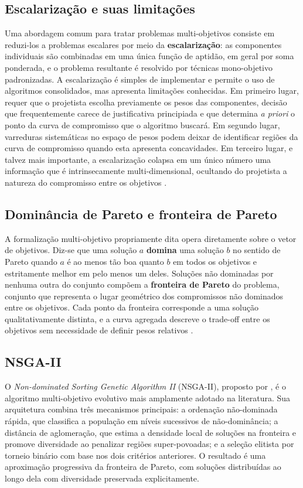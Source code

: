 \subsection{Escalarização e suas limitações}

Uma abordagem comum para tratar problemas multi-objetivos consiste em reduzi-los a problemas escalares por meio da \textbf{escalarização}: as componentes individuais são combinadas em uma única função de aptidão, em geral por soma ponderada, e o problema resultante é resolvido por técnicas mono-objetivo padronizadas. A escalarização é simples de implementar e permite o uso de algoritmos consolidados, mas apresenta limitações conhecidas. Em primeiro lugar, requer que o projetista escolha previamente os pesos das componentes, decisão que frequentemente carece de justificativa principiada e que determina \textit{a priori} o ponto da curva de compromisso que o algoritmo buscará. Em segundo lugar, varreduras sistemáticas no espaço de pesos podem deixar de identificar regiões da curva de compromisso quando esta apresenta concavidades. Em terceiro lugar, e talvez mais importante, a escalarização colapsa em um único número uma informação que é intrinsecamente multi-dimensional, ocultando do projetista a natureza do compromisso entre os objetivos \cite{deb2001multiobjective}.

\subsection{Dominância de Pareto e fronteira de Pareto}

A formalização multi-objetivo propriamente dita opera diretamente sobre o vetor de objetivos. Diz-se que uma solução $a$ \textbf{domina} uma solução $b$ no sentido de Pareto quando $a$ é ao menos tão boa quanto $b$ em todos os objetivos e estritamente melhor em pelo menos um deles. Soluções não dominadas por nenhuma outra do conjunto compõem a \textbf{fronteira de Pareto} do problema, conjunto que representa o lugar geométrico dos compromissos não dominados entre os objetivos. Cada ponto da fronteira corresponde a uma solução qualitativamente distinta, e a curva agregada descreve o trade-off entre os objetivos sem necessidade de definir pesos relativos \cite{deb2001multiobjective}.

\subsection{NSGA-II}

O \textit{Non-dominated Sorting Genetic Algorithm II} (NSGA-II), proposto por , é o algoritmo multi-objetivo evolutivo mais amplamente adotado na literatura. Sua arquitetura combina três mecanismos principais: a ordenação não-dominada rápida, que classifica a população em níveis sucessivos de não-dominância; a distância de aglomeração, que estima a densidade local de soluções na fronteira e promove diversidade ao penalizar regiões super-povoadas; e a seleção elitista por torneio binário com base nos dois critérios anteriores. O resultado é uma aproximação progressiva da fronteira de Pareto, com soluções distribuídas ao longo dela com diversidade preservada explicitamente.

